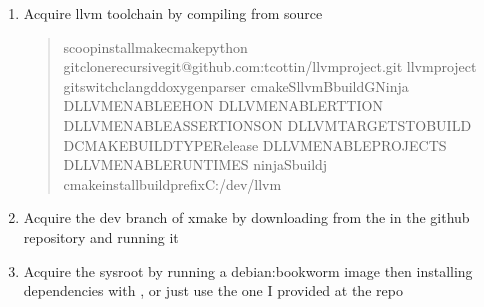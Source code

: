 \documentclass[a4paper,11pt,openany,oneside,english]{sphinxmanual}
\begin{document}
\label{\detokenize{index:steps-to-reproduce}}\begin{enumerate}
%
\item {} 
\sphinxAtStartPar
Acquire llvm toolchain by compiling from source
\begin{quote}

\begin{sphinxVerbatim}[commandchars=\\\{\}]
scoopinstallmakecmakepython
gitclone\PYGZhy{}\PYGZhy{}recursivegit@github.com:tcottin/llvm\PYGZhy{}project.git
llvm\PYGZhy{}project
gitswitchclangd\PYGZhy{}doxygen\PYGZhy{}parser
cmake\PYGZhy{}Sllvm\PYGZhy{}Bbuild\PYGZhy{}GNinja\PYGZca{}
\PYGZhy{}DLLVM\PYGZus{}ENABLE\PYGZus{}EHON\PYGZca{}
\PYGZhy{}DLLVM\PYGZus{}ENABLE\PYGZus{}RTTION\PYGZca{}
\PYGZhy{}DLLVM\PYGZus{}ENABLE\PYGZus{}ASSERTIONSON\PYGZca{}
\PYGZhy{}DLLVM\PYGZus{}TARGETS\PYGZus{}TO\PYGZus{}BUILD\PYGZca{}
\PYGZhy{}DCMAKE\PYGZus{}BUILD\PYGZus{}TYPERelease\PYGZca{}
\PYGZhy{}DLLVM\PYGZus{}ENABLE\PYGZus{}PROJECTS\PYGZca{}
\PYGZhy{}DLLVM\PYGZus{}ENABLE\PYGZus{}RUNTIMES
ninja\PYGZhy{}Sbuild\PYGZhy{}j
cmake\PYGZhy{}\PYGZhy{}installbuild\PYGZhy{}\PYGZhy{}prefixC:/dev/llvm
\end{sphinxVerbatim}
\end{quote}

\item {} 
\sphinxAtStartPar
Acquire the dev branch of xmake by downloading
 from the  in the github
repository and running it

\item {} 
\sphinxAtStartPar
Acquire the sysroot by running a debian:bookworm image then
installing dependencies with , or just use the one I provided
at the repo
\begin{quote}


\end{quote}
\end{enumerate}
\end{document}
